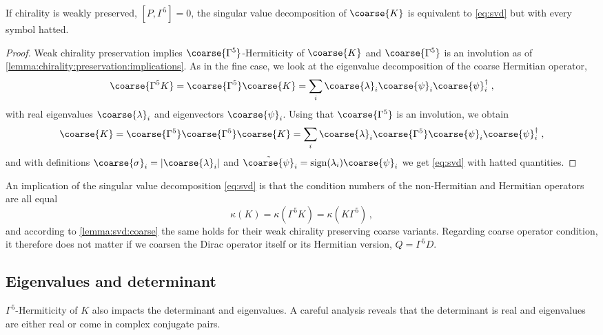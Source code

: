 \begin{lemma} \label{lemma:svd:coarse}
If chirality is weakly preserved, $[P, \Gamma^5]=0$, the singular value decomposition of $\coarse{K}$ is equivalent to \cref{eq:svd} but with every symbol hatted.
\end{lemma}

\begin{proof}
Weak chirality preservation implies $\coarse{\Gamma^{5}}$-Hermiticity of $\coarse{K}$ and $\coarse{\Gamma^{5}}$ is an involution as of \cref{lemma:chirality:preservation:implications}.
As in the fine case, we look at the eigenvalue decomposition of the coarse Hermitian operator,
\begin{equation}
\coarse{\Gamma^{5} K} = \coarse{\Gamma^{5}} \coarse{K} = \sum_{i} \coarse{\lambda}_i \coarse{\psi}_i \coarse{\psi}_i^{\dagger} \;,
\end{equation}
with real eigenvalues $\coarse{\lambda}_i$ and eigenvectors $\coarse{\psi}_i$. Using that $\coarse{\Gamma^{5}}$ is an involution, we obtain
\begin{equation}
\coarse{K} = \coarse{\Gamma^{5}} \coarse{\Gamma^{5}} \coarse{K} = \sum_{i} \coarse{\lambda}_i \coarse{\Gamma^{5}} \coarse{\psi}_i \coarse{\psi}_i^{\dagger} \;,
\end{equation}
and with definitions $\coarse{\sigma}_i = \lvert \coarse{\lambda}_i \rvert$ and $\tilde{\coarse{\psi}}_i = \text{sign}(\lambda_i) \coarse{\psi}_i$ we get \cref{eq:svd} with hatted quantities.
\end{proof}

An implication of the singular value decomposition \cref{eq:svd} is that the condition numbers of the non-Hermitian and Hermitian operators are all equal
\begin{equation} \label{eq:cond:K:g5K:equal}
\kappa(K) = \kappa(\Gamma^{5} K) = \kappa(K \Gamma^{5}) \,,
\end{equation}
and according to \cref{lemma:svd:coarse} the same holds for their weak chirality preserving coarse variants.
Regarding coarse operator condition, it therefore does not matter if we coarsen the Dirac operator itself or its Hermitian version, $Q=\Gamma^{5} D$.

\subsection{Eigenvalues and determinant}

$\Gamma^{5}$-Hermiticity of $K$ also impacts the determinant and eigenvalues.
A careful analysis reveals that the determinant is real and eigenvalues are either real or come in complex conjugate pairs.

